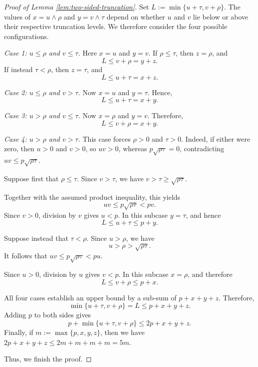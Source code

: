 \documentclass[11pt]{article}
\begin{document}
\begin{proof}[Proof of Lemma \ref{lem:two-sided-truncation}]
Set $L:=\min\{u+\tau,v+\rho\}$.
The values of \(x=u\wedge\rho\) and \(y=v\wedge\tau\) depend on whether
\(u\) and \(v\) lie below or above their respective truncation levels.  We
therefore consider the four possible configurations.

\medskip
\noindent
\emph{Case 1: \(u\leq\rho\) and \(v\leq\tau\).}
Here \(x=u\) and \(y=v\).  If \(\rho\leq\tau\), then \(z=\rho\), and
\[
L
\leq
v+\rho
=
y+z.
\]
If instead \(\tau<\rho\), then \(z=\tau\), and
\[
L
\leq
u+\tau
=
x+z.
\]

\medskip
\noindent
\emph{Case 2: \(u\leq\rho\) and \(v>\tau\).}
Now \(x=u\) and \(y=\tau\).  Hence,
\[
L
\leq
u+\tau
=
x+y.
\]

\medskip
\noindent
\emph{Case 3: \(u>\rho\) and \(v\leq\tau\).}
Now \(x=\rho\) and \(y=v\).  Therefore,
\[
L
\leq
v+\rho
=
x+y.
\]

\medskip
\noindent
\emph{Case 4: \(u>\rho\) and \(v>\tau\).}
This case forces \(\rho>0\) and \(\tau>0\).  Indeed, if either were zero,
then \(u>0\) and \(v>0\), so \(uv>0\), whereas
\(p\sqrt{\rho\tau}=0\), contradicting
\(uv\leq p\sqrt{\rho\tau}\).

Suppose first that \(\rho\leq\tau\).  Since \(v>\tau\), we have $v>\tau\geq\sqrt{\rho\tau}$.

Together with the assumed product inequality, this yields
\[
uv
\leq
p\sqrt{\rho\tau}
<
pv.
\]
Since \(v>0\), division by \(v\) gives \(u<p\).  In this subcase
\(y=\tau\), and hence
\[
L
\leq
u+\tau
\leq
p+y.
\]

Suppose instead that \(\tau<\rho\).  Since \(u>\rho\), we have
\[
u>\rho>\sqrt{\rho\tau}.
\]
It follows that $uv
\leq
p\sqrt{\rho\tau}
<
pu$.

Since \(u>0\), division by \(u\) gives \(v<p\).  In this subcase
\(x=\rho\), and therefore
\[
L
\leq
v+\rho
\leq
p+x.
\]

All four cases establish an upper bound by a sub-sum of
\(p+x+y+z\).  Therefore,
\[
\min\{u+\tau,v+\rho\}
=L
\leq
p+x+y+z.
\]
Adding \(p\) to both sides gives
\[
p+\min\{u+\tau,v+\rho\}
\leq
2p+x+y+z.
\]
Finally, if \(m:=\max\{p,x,y,z\}\), then we have
$2p+x+y+z
\leq
2m+m+m+m
=
5m$.

Thus, we finish the proof.
\end{proof}


\end{document}
